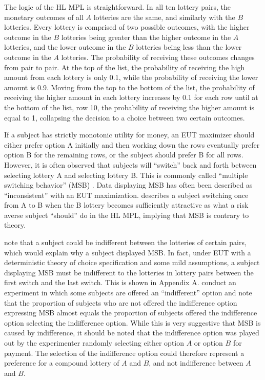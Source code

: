 \documentclass[../main.tex]{subfiles}
\begin{document}
The logic of the HL MPL is straightforward.
In all ten lottery pairs, the monetary outcomes of all $A$ lotteries are the same, and similarly with the $B$ lotteries.
Every lottery is comprised of two possible outcomes, with the higher outcome in the $B$ lotteries being greater than the higher outcome in the $A$ lotteries, and the lower outcome in the $B$ lotteries being less than the lower outcome in the $A$ lotteries.
The probability of receiving these outcomes changes from pair to pair.
At the top of the list, the probability of receiving the high amount from each lottery is only 0.1, while the probability of receiving the lower amount is 0.9.
Moving from the top to the bottom of the list, the probability of receiving the higher amount in each lottery increases by 0.1 for each row until at the bottom of the list, row 10, the probability of receiving the higher amount is equal to 1, collapsing the decision to a choice between two certain outcomes.


If a subject has strictly monotonic utility for money, an EUT maximizer should either prefer option A initially and then working down the rows eventually prefer option B for the remaining rows, or the subject should prefer B for all rows.
However, it is often observed that subjects will \enquote{switch} back and forth between selecting lottery A and selecting lottery B.
This is commonly called \enquote{multiple switching behavior} (MSB) \parencite{Bruner2011}.
Data displaying MSB has often been described as \enquote{inconsistent} with an EUT maximization.
\textcite[1645]{Holt2002} describes a subject switching once from A to B when the B lottery becomes sufficiently attractive as what a risk averse subject \enquote{should} do in the HL MPL, implying that MSB is contrary to theory.

\textcite[347]{Harrison2007} note that a subject could be indifferent between the lotteries of certain pairs, which would explain why a subject displayed MSB.
In fact, under EUT with a deterministic theory of choice specification and some mild assumptions, a subject displaying MSB must be indifferent to the lotteries in lottery pairs between the first switch and the last switch.
This is shown in Appendix A.
\textcite{Harrison2007} conduct an experiment in which some subjects are offered an \enquote{indifferent} option and note that the proportion of subjects who are not offered the indifference option expressing MSB almost equals the proportion of subjects offered the indifference option  selecting the indifference option.
While this is very suggestive that MSB is caused by indifference, it should be noted that the indifference option was played out by the experimenter randomly selecting either option $A$ or option $B$ for payment.
The selection of the indifference option could therefore represent a preference for a compound lottery of $A$ and $B$, and not indifference between $A$ and $B$.
\end{document}
